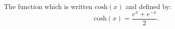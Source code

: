 
The function which is written $\mathrm{cosh}(x)$ and defined by:
$$\mathrm{cosh}(x) = \frac{e^x + e^{-x}}{2}.$$

  